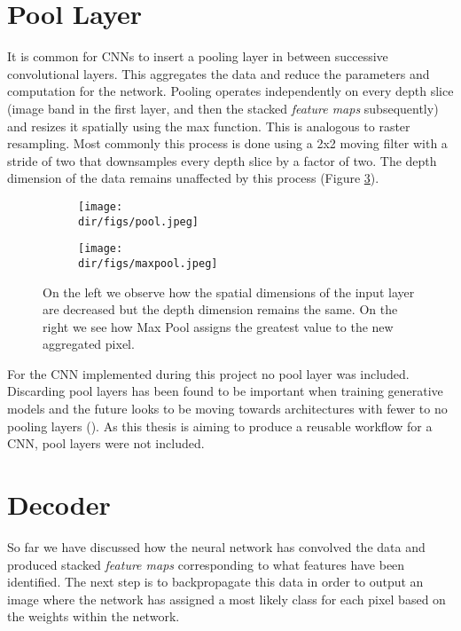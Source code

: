 \section{Pool Layer}
It is common for CNNs to insert a pooling layer in between successive convolutional layers. This aggregates the data and reduce the parameters and computation for the network. Pooling operates independently on every depth slice (image band in the first layer, and then the stacked \textit{feature maps} subsequently) and resizes it spatially using the max function. This is analogous to raster resampling. Most commonly this process is done using a 2x2 moving filter with a stride of two that downsamples every depth slice by a factor of two. The depth dimension of the data remains unaffected by this process (Figure \ref{fig.pooling}).
\begin{figure}[htbp]
\centering
\begin{subfigure}{0.45\textwidth}
\texttt{[image: \\dir/figs/pool.jpeg]}
\caption{}
\label{fig.pool}
\end{subfigure}%
\qquad
\begin{subfigure}{0.45\textwidth}
\texttt{[image: \\dir/figs/maxpool.jpeg]}
\caption{}
\label{fig.maxpool}
\end{subfigure}
\caption[Example of pooling and Max Pool function]{On the left we observe how the spatial dimensions of the input layer are decreased but the depth dimension remains the same. On the right we see how Max Pool assigns the greatest value to the new aggregated pixel.}
\label{fig.pooling}
\end{figure}
\par
For the CNN implemented during this project no pool layer was included. Discarding pool layers has been found to be important when training generative models and the future looks to be moving towards architectures with fewer to no pooling layers (\cite{Springenberg14}). As this thesis is aiming to produce a reusable workflow for a CNN, pool layers were not included. 

\section{Decoder}
So far we have discussed how the neural network has convolved the data and produced stacked \textit{feature maps} corresponding to what features have been identified. The next step is to backpropagate this data in order to output an image where the network has assigned a most likely class for each pixel based on the weights within the network. 

